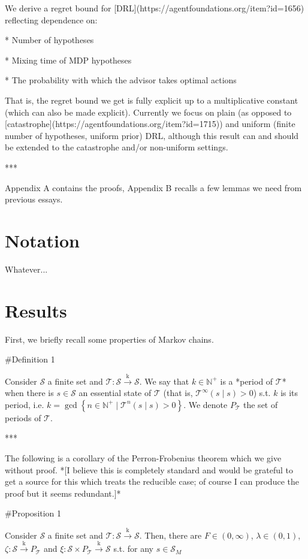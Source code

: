 \documentclass[a4paper]{article}
\newcommand{\AC}[1]{\left\{#1\right\}}
\newcommand{\Nats}{\mathbb{N}}
\newcommand{\M}{\xrightarrow{\text{k}}}
\newcommand{\St}{\mathcal{S}}
\newcommand{\T}{\mathcal{T}}
\newcommand{\Pd}{P}
\begin{document}
We derive a regret bound for [DRL](https://agentfoundations.org/item?id=1656) reflecting dependence on:

* Number of hypotheses

* Mixing time of MDP hypotheses

* The probability with which the advisor takes optimal actions

That is, the regret bound we get is fully explicit up to a multiplicative constant (which can also be made explicit). Currently we focus on plain (as opposed to [catastrophe](https://agentfoundations.org/item?id=1715)) and uniform (finite number of hypotheses, uniform prior) DRL, although this result can and should be extended to the catastrophe and/or non-uniform settings.

***

Appendix A contains the proofs, Appendix B recalls a few lemmas we need from previous essays.

\section{Notation}

Whatever...

\section{Results}

First, we briefly recall some properties of Markov chains.

\#Definition 1

Consider $\St$ a finite set and $\T: \St \M \St$. We say that $k \in \Nats^+$ is a *period of $\T$* when there is $s \in \St$ an essential state of $\T$ (that is, $\T^\infty(s \mid s) > 0$) s.t. $k$ is its period, i.e. $k = \gcd \AC{n \in \Nats^+ \mid \T^n(s \mid s) > 0}$. We denote $\Pd_\T$ the set of periods of $\T$.

***

The following is a corollary of the Perron-Frobenius theorem which we give without proof. *[I believe this is completely standard and would be grateful to get a source for this which treats the reducible case; of course I can produce the proof but it seems redundant.]*

\#Proposition 1

Consider $\St$ a finite set and $\T: \St \M \St$. Then, there are $F \in (0,\infty)$, $\lambda\in(0,1)$, $\zeta: \St \M \Pd_\T$ and $\xi: \St \times \Pd_\T \M \St$ s.t. for any $s \in \St_M$
\end{document}
